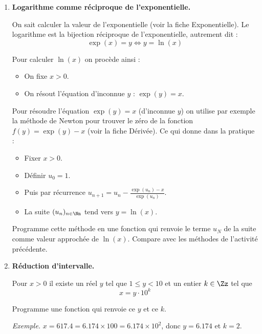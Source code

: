 \documentclass[11pt,class=report,crop=false]{standalone}
\begin{document}
\begin{activite}


  \begin{enumerate}
    \item \textbf{Logarithme comme réciproque de l'exponentielle.}
    
    On sait calculer la valeur de l'exponentielle (voir la fiche \og{}Exponentielle\fg{}).
	Le logarithme est la bijection réciproque de l'exponentielle, autrement dit :
	$$\exp(x)=y  \iff  y = \ln(x)$$
	
	Pour calculer $\ln(x)$ on procède ainsi :
	\begin{itemize}
	  \item On fixe $x>0$.
	  \item On résout l'équation d'inconnue $y$ : \og{}$\exp(y)=x$\fg{}.
	\end{itemize}
	
	Pour résoudre l'équation $\exp(y)=x$ (d'inconnue $y$) on utilise par exemple la méthode de Newton
	pour trouver le zéro de la fonction $f(y) = \exp(y)-x$ (voir la fiche \og{}Dérivée\fg{}). Ce qui donne dans la pratique :
	\begin{itemize}
	  \item Fixer $x>0$. 
	  \item Définir $u_0 = 1$.
	  \item Puis par récurrence $u_{n+1} = u_n - \frac{\exp(u_n)-x}{\exp(u_n)}$.
	  \item La suite $(u_n)_{n\in\Nn}$ tend vers $y=\ln(x)$.
	\end{itemize}
	
   Programme cette méthode en une fonction  qui renvoie le terme $u_N$ de la suite comme valeur approchée de $\ln(x)$. Compare avec les méthodes de l'activité précédente.
   
   
    \item \textbf{Réduction d'intervalle.}   
    
    Pour $x>0$ il existe un réel $y$ tel que $1 \le y < 10$ et un entier $k \in \Zz$ tel que    
    $$x = y \cdot 10^{k}$$
    
    Programme une fonction  qui renvoie ce $y$ et ce $k$.
	
	
	\emph{Exemple.} $x=617.4 = 6.174 \times 100=6.174 \times 10^2$, donc $y=6.174$ et $k=2$.
	    

\end{enumerate}
\end{activite}
\end{document}
